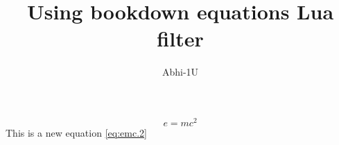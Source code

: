\documentclass[a4paper,12pt]{article} %
\author{Abhi-1U}
\title{Using bookdown equations Lua filter}
\begin{document}
\begin{equation}\label{eq:emc.2}
    e = m c^2
\end{equation}
This is a new equation \ref{eq:emc.2}
\end{document}
